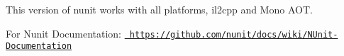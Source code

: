 This version of nunit works with all platforms, il2cpp and Mono A\+OT.

For Nunit Documentation\+: \href{https://github.com/nunit/docs/wiki/NUnit-Documentation}{\texttt{ https\+://github.\+com/nunit/docs/wiki/\+N\+Unit-\/\+Documentation}} 